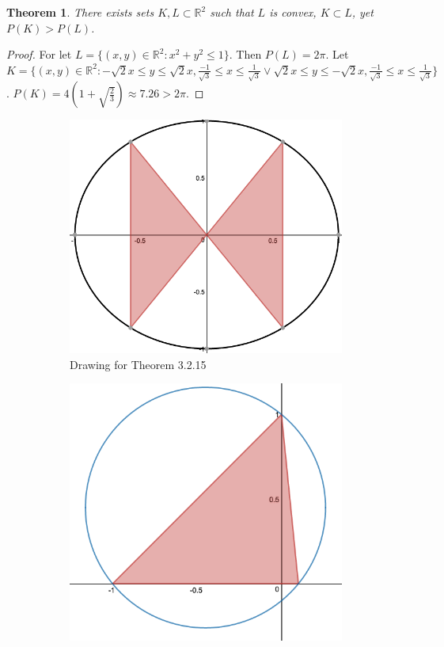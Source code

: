 \documentclass[oneside]{book}
\theoremstyle{mystyle}
\newtheorem{theorem}{Theorem}[section]
\begin{document}
\begin{theorem}
There exists sets $K,L\subset \mathbb{R}^2$ such that $L$ is convex, $K\subset L$, yet $P(K)>P(L)$.
\end{theorem}
\begin{proof}
For let $L = \{(x,y)\in \mathbb{R}^2: x^2 + y^2 \leq 1\}$. Then $P(L) = 2\pi$. Let $K = \{(x,y)\in \mathbb{R}^2: -\sqrt{2}x\leq y \leq \sqrt{2}x,\frac{-1}{\sqrt{3}} \leq x \leq \frac{1}{\sqrt{3}} \lor \sqrt{2}x\leq y \leq -\sqrt{2}x,\frac{-1}{\sqrt{3}} \leq x \leq \frac{1}{\sqrt{3}} \}$. $P(K) = 4(1+ \sqrt{\frac{2}{3}}) \approx 7.26>2\pi$.
\end{proof}

\begin{figure}[H]
  \begin{subfigure}[b]{0.49\textwidth}
     \centering
    \includegraphics[width=\textwidth]{Circles-3.png}
    \caption{Drawing for Theorem 3.2.15}
  \end{subfigure}
  \begin{subfigure}[b]{0.49\textwidth}
    \centering
    \includegraphics[width=\textwidth]{Circle-4.png}

\end{subfigure}
\end{figure}
\end{document}
